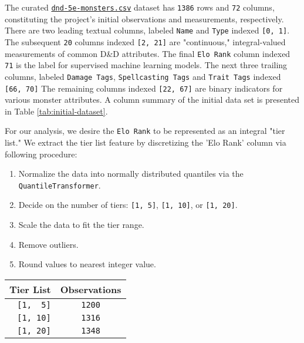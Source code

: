 \documentclass[12pt]{diazessay}
\begin{document}
The curated
\href{https://github.com/recursion-ninja/CSCI-795-ML/blob/main/data/dnd-5e-monsters.csv}{\texttt{dnd-5e-monsters.csv}}
dataset has \texttt{1386} rows and \texttt{72} columns, constituting the
project's initial observations and measurements, respectively. There are
two leading textual columns, labeled
\texttt{\textquotesingle{}Name\textquotesingle{}} and
\texttt{\textquotesingle{}Type\textquotesingle{}} indexed
\texttt{{[}0,\ 1{]}}. The subsequent \texttt{20} columns indexed
\texttt{{[}2,\ 21{]}} are "continuous," integral-valued measurements of
common D\&D attributes. The final
\texttt{\textquotesingle{}Elo\ Rank\textquotesingle{}} column indexed
\texttt{71} is the label for supervised machine learning models. The
next three trailing columns, labeled \texttt{Damage\ Tags},
\texttt{Spellcasting\ Tags} and \texttt{Trait\ Tags} indexed
\texttt{{[}66,\ 70{]}} The remaining columns indexed
\texttt{{[}22,\ 67{]}} are binary indicators for various monster
attributes. A column summary of the initial data set is presented in Table \ref{tab:initial-dataset}.



For our analysis, we desire the
\texttt{\textquotesingle{}Elo\ Rank\textquotesingle{}} to be represented
as an integral "tier list." We extract the tier list feature by
discretizing the 'Elo Rank' column via following procedure:

\begin{enumerate}
\def\labelenumi{\arabic{enumi}.}
\item
  Normalize the data into normally distributed quantiles via the
  \texttt{QuantileTransformer}.
\item
  Decide on the number of tiers: \texttt{{[}1,\ 5{]}},
  \texttt{{[}1,\ 10{]}}, or \texttt{{[}1,\ 20{]}}.
\item
  Scale the data to fit the tier range.
\item
  Remove outliers.
\item
  Round values to nearest integer value.
\end{enumerate}

\begin{table}[!htbp] \centering 
	\caption{The removal of outliers will shrink the dataset depending on tier list size}
	\label{tab:shrunk-observations}
\begin{longtable}[]{@{}rc@{}}
\toprule
Tier List & Observations \\
\midrule
\endhead
\texttt{{[}1,\ \ 5{]}} & \texttt{1200} \\
\texttt{{[}1,\ 10{]}} & \texttt{1316} \\
\texttt{{[}1,\ 20{]}} & \texttt{1348} \\
\bottomrule
\end{longtable}
\end{table}
\end{document}
